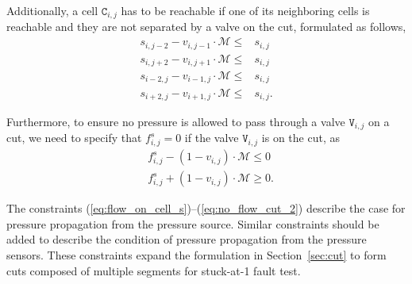 Additionally, 
a cell $\mathtt{C}_{i,j}$ has to be reachable if one of its
neighboring cells is reachable and they are not separated by a
valve on the cut, formulated as follows,
\begin{align}
\label{eq:must_reach}
s_{i,j-2} - v_{i,j-1}\cdot\mathcal{M} \le &s_{i,j} \\
\label{eq:must_reach_2}
s_{i,j+2} - v_{i,j+1}\cdot\mathcal{M} \le &s_{i,j} \\
\label{eq:must_reach_3}
s_{i-2,j} - v_{i-1,j}\cdot\mathcal{M} \le &s_{i,j} \\
\label{eq:must_reach_4}
s_{i+2,j} - v_{i+1,j}\cdot\mathcal{M} \le &s_{i,j}.
\end{align}

Furthermore,
to ensure no pressure is allowed to pass through a valve
$\mathtt{V}_{i,j}$ on a cut, we need to specify that $f^s_{i,j}=0$
if the valve $\mathtt{V}_{i,j}$ is on the cut, as
\begin{align}
\label{eq:no_flow_cut}
&f^{s}_{i,j} - (1 - v_{i,j})\cdot\mathcal{M} \le 0\\
\label{eq:no_flow_cut_2}
&f^{s}_{i,j} + (1 - v_{i,j})\cdot\mathcal{M} \ge 0.
\end{align}


The constraints 
(\ref{eq:flow_on_cell_s})--(\ref{eq:no_flow_cut_2}) describe the
case
for pressure propagation from the pressure source. Similar
constraints should be added to describe the condition of pressure propagation
from the pressure sensors.  These constraints expand the formulation in
Section~\ref{sec:cut} to form cuts composed of multiple segments for stuck-at-1
fault test.

